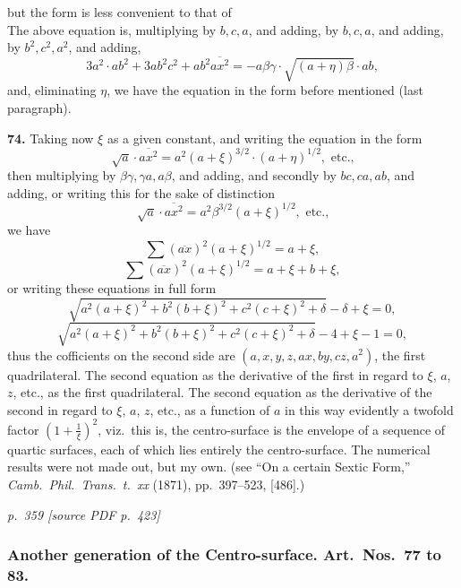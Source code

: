 \documentclass[11pt,a4paper]{article}
\newcommand{\pagemarker}[2]{\par\bigskip\noindent\textit{p.~#1 [source PDF p.~#2]}\par\smallskip}
\begin{document}
but the form is less convenient to that of \\
The above equation is, multiplying by $b, c, a$, and adding, by $b, c, a$, and adding, by $b^2, c^2, a^2$, and adding,
\[
3a^2 \cdot ab^2 + 3a b^2 c^2 + a b^2 \overline{a x^2} = - a \beta \gamma \cdot \sqrt{(a + \eta) \beta} \cdot ab,
\]
and, eliminating $\eta$, we have the equation in the form before mentioned (last paragraph).

\textbf{74.} Taking now $\xi$ as a given constant, and writing the equation in the form
\[
\sqrt{a} \cdot \overline{a x^2} = a^2 (a + \xi)^{3/2} \cdot (a + \eta)^{1/2}, \text{ etc.,}
\]
then multiplying by $\beta \gamma, \gamma a, a \beta$, and adding, and secondly by $b c, c a, a b$, and adding, or writing this for the sake of distinction
\[
\sqrt{a} \cdot \overline{a x^2} = a^2 \beta^{3/2} (a + \xi)^{1/2}, \text{ etc.,}
\]
we have
\[
\sum (\overline{a x})^2 (a + \xi)^{1/2} = a + \xi,
\]
\[
\sum (\overline{a x})^2 (a + \xi)^{1/2} = a + \xi + b + \xi,
\]
or writing these equations in full form
\[
\sqrt{a^2 (a + \xi)^2 + b^2 (b + \xi)^2 + c^2 (c + \xi)^2 + \delta} - \delta + \xi = 0,
\]
\[
\sqrt{a^2 (a + \xi)^2 + b^2 (b + \xi)^2 + c^2 (c + \xi)^2 + \delta} - 4 + \xi - 1 = 0,
\]
thus the cofficients on the second side are $(a, x, y, z, ax, by, cz, a^2)$, the first quadrilateral. The second equation as the derivative of the first in regard to $\xi$, $a$, $z$, etc., as the first quadrilateral. The second equation as the derivative of the second in regard to $\xi$, $a$, $z$, etc., as a function of $a$ in this way evidently a twofold factor $\left(1 + \frac{1}{\xi}\right)^2$, viz.\ this is, the centro-surface is the envelope of a sequence of quartic surfaces, each of which lies entirely the centro-surface. The numerical results were not made out, but my own. (see ``On a certain Sextic Form,'' \textit{Camb.\ Phil.\ Trans.\ t.\ xx} (1871), pp.\ 397--523, [486].)

\clearpage

\bigskip
\pagemarker{359}{423}
\smallskip

\subsubsection*{Another generation of the Centro-surface. Art.\ Nos.\ 77 to 83.}
\end{document}
